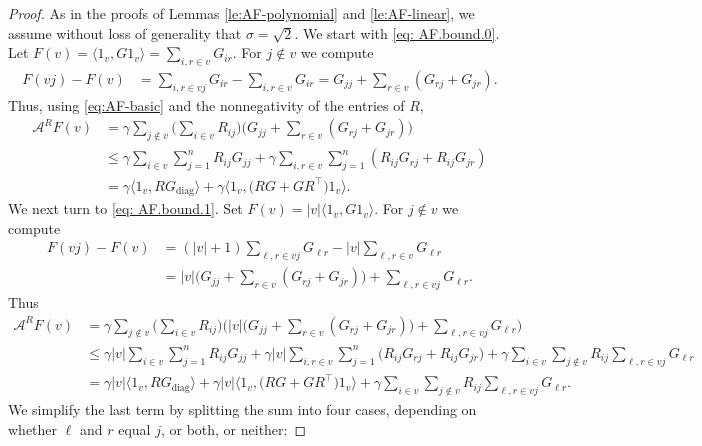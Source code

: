 \documentclass[11pt,reqno]{amsart}
\numberwithin{equation}{section}
\theoremstyle{definition}
\def\A{{\mathcal A}}
\begin{document}
\begin{proof} 
As in the proofs of Lemmas \ref{le:AF-polynomial} and \ref{le:AF-linear}, we assume without loss of generality that $\sigma = \sqrt{2}$. We start with \eqref{eq: AF.bound.0}. Let $F(v) = \langle 1_v, G1_v\rangle = \sum_{i,r \in v}G_{ir}$. 	For $j \notin v$ we compute
		\begin{align*}
			F(vj) - F(v) &= \sum_{i,r \in vj}G_{ir} - \sum_{i,r \in v}G_{ir} = G_{jj} + \sum_{r \in v}(G_{rj} + G_{jr}).
		\end{align*}
		Thus, using \eqref{eq:AF-basic} and the nonnegativity of the entries of $R$,
		\begin{align*}
			\A^{R} F(v) &=  \gamma \sum_{j \notin v}\bigg(\sum_{i \in v} R_{ij}\bigg)\bigg(G_{jj} + \sum_{r \in v}(G_{rj} + G_{jr})\bigg) \\
			&\le \gamma \sum_{i \in v}\sum_{j=1}^n R_{ij}G_{jj} + \gamma \sum_{i,r \in v} \sum_{j =1}^n (R_{ij}G_{rj} + R_{ij}G_{jr}) \\
			&= \gamma \langle 1_v , R G_{\mathrm{diag}}\rangle  + \gamma  \langle 1_v, \big( R G +GR^\top \big) 1_v\rangle .
		\end{align*} 
	We next turn to \eqref{eq: AF.bound.1}. Set $F(v)=|v|\langle 1_v, G1_v\rangle$. For $j \notin v$ we compute  
		\begin{align*}
			F(vj) - F(v) &= (|v| +1)\sum_{\ell, r\in vj}G_{\ell r} -  |v| \sum_{\ell, r\in v}G_{\ell r} \\
			&= |v| \bigg(G_{jj} + \sum_{r \in v}(G_{rj} + G_{jr})\bigg) + \sum_{\ell, r\in vj} G_{\ell r}.
		\end{align*}
		Thus
		\begin{align*}
			\A^{R}  F(v) &= \gamma \sum_{j \notin v}\bigg(\sum_{i \in v} R_{ij}\bigg)\bigg(  |v| \bigg(G_{jj} + \sum_{r \in v}(G_{rj} + G_{jr})\bigg) + \sum_{\ell, r\in vj} G_{\ell r} \bigg) \\
			&\le \gamma  |v|  \sum_{i \in v}\sum_{j=1}^n R_{ij}G_{jj} + \gamma  |v| \sum_{i,r \in v} \sum_{j =1}^n \Big(R_{ij}G_{rj} + R_{ij}G_{jr}\Big) 
			+ \gamma \sum_{i\in v}\sum_{j \notin  v} R_{ij} \sum_{\ell, r\in vj} G_{\ell r}  \\
			&= \gamma |v|  \langle 1_v, R G_{\mathrm{diag}}\rangle  + \gamma |v|  \langle 1_v, \big( R G +GR^\top \big) 1_v\rangle + \gamma \sum_{i\in v}\sum_{j\notin  v} R_{ij} \sum_{\ell, r\in vj} G_{\ell r}.
		\end{align*}
		We simplify the last term by splitting the sum into four cases, depending on whether $\ell$ and $r$ equal $j$, or both, or neither:

\end{proof}
\end{document}
